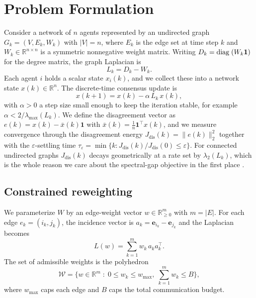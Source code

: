 \documentclass[letterpaper, 11 pt, journal, twoside]{IEEEtran}
\newcommand{\diag}{{\rm diag\;}}
\newcommand{\R}{\mathbb{R}}
\begin{document}
\section{Problem Formulation}
\label{sec:problem}
Consider a network of $n$ agents represented by an undirected graph
$G_k = (V, E_k, W_k)$ with $|V| = n$, where $E_k$ is the edge set at
time step $k$ and $W_k \in \R^{n \times n}$ is a symmetric
nonnegative weight matrix. Writing $D_k = \diag(W_k \mathbf{1})$ for
the degree matrix, the graph Laplacian is
\begin{equation}
L_k = D_k - W_k.
\end{equation}
Each agent $i$ holds a scalar state $x_i(k)$, and we collect these
into a network state $x(k) \in \R^n$. The discrete-time consensus
update is
\begin{equation}
x(k+1) = x(k) - \alpha\, L_k\, x(k),
\label{eq:consensus}
\end{equation}
with $\alpha > 0$ a step size small enough to keep the iteration
stable, for example $\alpha < 2/\lambda_{\max}(L_k)$. We define the
disagreement vector as $e(k) = x(k) - \bar{x}(k)\mathbf{1}$ with
$\bar{x}(k) = \frac{1}{n}\mathbf{1}^\top x(k)$, and we measure
convergence through the disagreement energy
$J_{\text{dis}}(k) = \|e(k)\|_2^2$ together with the
$\varepsilon$-settling time
$\tau_\varepsilon = \min\{k : J_{\text{dis}}(k)/J_{\text{dis}}(0) \le \varepsilon\}$.
For connected undirected graphs $J_{\text{dis}}(k)$ decays
geometrically at a rate set by $\lambda_2(L_k)$, which is the whole
reason we care about the spectral-gap objective in the first place
\cite{Fiedler1973,OlfatiSaber2007}.

\subsection{Constrained reweighting}
We parameterize $W$ by an edge-weight vector $w \in \R^m_{\ge 0}$
with $m = |E|$. For each edge $e_k = (i_k, j_k)$, the incidence
vector is $a_k = \mathbf{e}_{i_k} - \mathbf{e}_{j_k}$ and the
Laplacian becomes
\begin{equation}
L(w) = \sum_{k=1}^{m} w_k\, a_k a_k^\top.
\label{eq:Lw-top}
\end{equation}
The set of admissible weights is the polyhedron
\begin{equation}
\mathcal{W} = \Big\{ w \in \R^m \;:\; 0 \le w_k \le w_{\max},\;
\textstyle\sum_{k=1}^m w_k \le B \Big\},
\label{eq:Wset-top}
\end{equation}
where $w_{\max}$ caps each edge and $B$ caps the total communication
budget.
\end{document}
